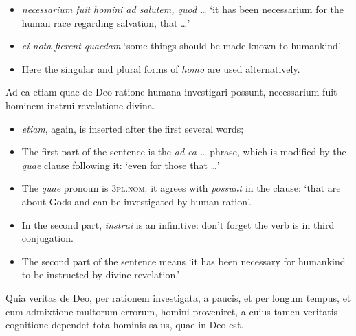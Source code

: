 \documentclass[a4paper, 12pt]{article}
\newcommand{\form}[1]{\emph{#1}}
\newcommand*{\category}[1]{\textsc{#1}}
\newcommand{\translate}[1]{`#1'}
\begin{document}
\begin{itemize}
    \item \form{necessarium fuit homini ad salutem, quod \dots} 
    \translate{it has been necessarium for the human race regarding salvation, that \dots}
    \item \form{ei nota fierent quaedam} 
    \translate{some things should be made known to humankind} 
    \item Here the singular and plural forms of \form{homo}
    are used alternatively.
\end{itemize}

\begin{exe}
    \ex Ad ea etiam quae de Deo ratione humana investigari possunt, necessarium fuit hominem instrui revelatione divina.
\end{exe}

\begin{itemize}
    \item \emph{etiam}, again, is inserted after the first several words;  
    \item The first part of the sentence is the \form{ad ea \dots} phrase,
    which is modified by the \form{quae} clause following it:
    \translate{even for those that \dots}
    \item The \form{quae} pronoun is \category{3pl.nom}: 
    it agrees with \form{possunt} in the clause: 
    \translate{that are about Gods and can be investigated by human ration}.
    \item In the second part, \form{instrui} is an infinitive: 
    don't forget the verb is in third conjugation.
    \item The second part of the sentence means 
    \translate{it has been necessary for humankind to be instructed by divine revelation.}
\end{itemize}

\begin{exe}
    \ex Quia veritas de Deo, per rationem investigata, a paucis, et per longum tempus, et cum admixtione multorum errorum, homini proveniret, a cuius tamen veritatis cognitione dependet tota hominis salus, quae in Deo est. 
\end{exe}
\end{document}
